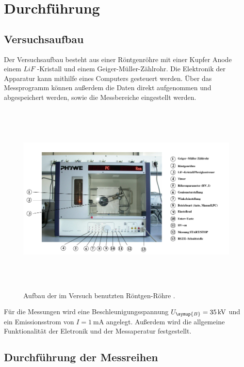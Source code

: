 \newpage
\section{Durchführung}
\label{sec:Durchführung}

\subsection{Versuchsaufbau}
\label{subsec:Versuchsaufbau}

Der Versuchsaufbau besteht aus einer Röntgenröhre mit einer Kupfer Anode einem
$LiF$ -Kristall und einem Geiger-Müller-Zählrohr. Die Elektronik der Apparatur kann
mithilfe eines Computers gesteuert werden. Über das Messprogramm können außerdem die
Daten direkt aufgenommen und abgespeichert werden, sowie die Messbereiche eingestellt
werden.
\begin{figure}[H]
  \centering
  \includegraphics[width=16.6cm,height=9.8cm]{Aufbau.png}
  \caption{Aufbau der im Versuch benutzten Röntgen-Röhre \cite{sample}.}
  \label{fig:Aufbau}
\end{figure}
Für die Messungen wird eine Beschleunigungsspannung $U_\symup{B} = \SI{35}{\kilo\volt}$ und ein
Emissionsstrom von $I = \SI{1}{\milli\ampere}$ angelegt. Außerdem wird die allgemeine Funktionalität
der Eletronik und der Messaperatur festgestellt.\\

\subsection{Durchführung der Messreihen}
\label{subsec:Messreihen}

